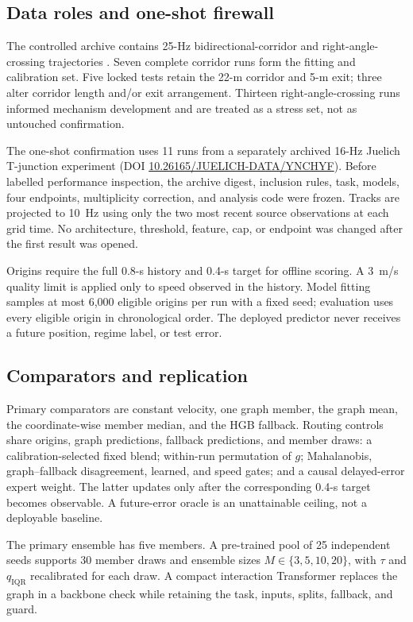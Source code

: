 \documentclass[preprint,11pt,authoryear]{elsarticle}
\begin{document}
\subsection{Data roles and one-shot firewall}
The controlled archive contains 25-Hz bidirectional-corridor and right-angle-crossing trajectories \citep{boltes2013,boltes2020}. Seven complete corridor runs form the fitting and calibration set. Five locked tests retain the 22-m corridor and 5-m exit; three alter corridor length and/or exit arrangement. Thirteen right-angle-crossing runs informed mechanism development and are treated as a stress set, not as untouched confirmation.

The one-shot confirmation uses 11 runs from a separately archived 16-Hz Juelich T-junction experiment (DOI \href{https://doi.org/10.26165/JUELICH-DATA/YNCHYF}{10.26165/JUELICH-DATA/YNCHYF}). Before labelled performance inspection, the archive digest, inclusion rules, task, models, four endpoints, multiplicity correction, and analysis code were frozen. Tracks are projected to 10~Hz using only the two most recent source observations at each grid time. No architecture, threshold, feature, cap, or endpoint was changed after the first result was opened.

Origins require the full 0.8-s history and 0.4-s target for offline scoring. A 3~m/s quality limit is applied only to speed observed in the history. Model fitting samples at most 6,000 eligible origins per run with a fixed seed; evaluation uses every eligible origin in chronological order. The deployed predictor never receives a future position, regime label, or test error.

\subsection{Comparators and replication}
Primary comparators are constant velocity, one graph member, the graph mean, the coordinate-wise member median, and the HGB fallback. Routing controls share origins, graph predictions, fallback predictions, and member draws: a calibration-selected fixed blend; within-run permutation of $g$; Mahalanobis, graph--fallback disagreement, learned, and speed gates; and a causal delayed-error expert weight. The latter updates only after the corresponding 0.4-s target becomes observable. A future-error oracle is an unattainable ceiling, not a deployable baseline.

The primary ensemble has five members. A pre-trained pool of 25 independent seeds supports 30 member draws and ensemble sizes $M\in\{3,5,10,20\}$, with $\tau$ and $q_{\mathrm{IQR}}$ recalibrated for each draw. A compact interaction Transformer replaces the graph in a backbone check while retaining the task, inputs, splits, fallback, and guard.
\end{document}
